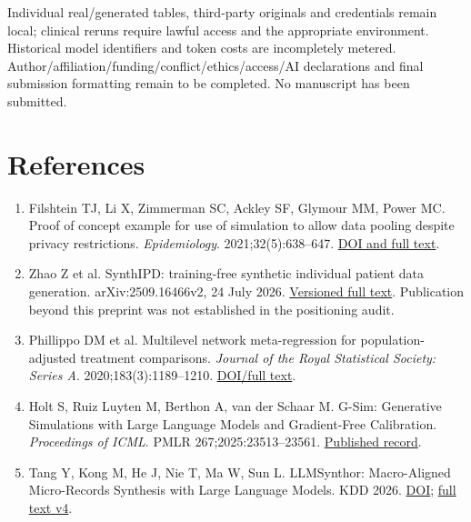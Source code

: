 \documentclass[10pt,twocolumn]{article}
\begin{document}
Individual real/generated tables, third-party originals and credentials remain local; clinical reruns require lawful access and the appropriate environment. Historical model identifiers and token costs are incompletely metered. Author/affiliation/funding/conflict/ethics/access/AI declarations and final submission formatting remain to be completed. No manuscript has been submitted.


\clearpage

\section*{References}

\begingroup\small

\begin{enumerate}

\setlength{\itemsep}{3pt}

\item Filshtein TJ, Li X, Zimmerman SC, Ackley SF, Glymour MM, Power MC. Proof of concept example for use of simulation to allow data pooling despite privacy restrictions. \emph{Epidemiology}. 2021;32(5):638–647. \href{https://pmc.ncbi.nlm.nih.gov/articles/PMC8338788/}{DOI and full text}.

\item Zhao Z et al. SynthIPD: training-free synthetic individual patient data generation. arXiv:2509.16466v2, 24 July 2026. \href{https://arxiv.org/html/2509.16466v2}{Versioned full text}. Publication beyond this preprint was not established in the positioning audit.

\item Phillippo DM et al. Multilevel network meta-regression for population-adjusted treatment comparisons. \emph{Journal of the Royal Statistical Society: Series A}. 2020;183(3):1189–1210. \href{https://rss.onlinelibrary.wiley.com/doi/full/10.1111/rssa.12579}{DOI/full text}.

\item Holt S, Ruiz Luyten M, Berthon A, van der Schaar M. G-Sim: Generative Simulations with Large Language Models and Gradient-Free Calibration. \emph{Proceedings of ICML}. PMLR 267;2025:23513–23561. \href{https://proceedings.mlr.press/v267/holt25b.html}{Published record}.

\item Tang Y, Kong M, He J, Nie T, Ma W, Sun L. LLMSynthor: Macro-Aligned Micro-Records Synthesis with Large Language Models. KDD 2026. \href{https://doi.org/10.1145/3770855.3818965}{DOI}; \href{https://arxiv.org/html/2505.14752v4}{full text v4}.


\end{enumerate}
\end{document}

